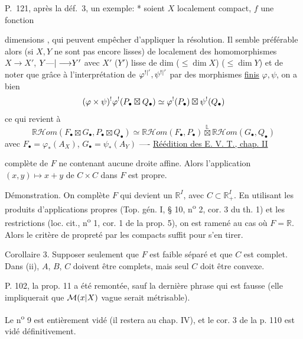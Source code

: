 P.\ 121, après la déf.\ 3, un exemple: * soient $X$ localement compact, $f$ une fonction

dimensions , qui peuvent empêcher d'appliquer la résolution. Il semble préférable alors  (si $X,Y$ ne sont pas encore lisses) de   localement des homomorphismes  $X\longrightarrow X'$, $Y{\text{---}|\longrightarrow}Y'$ avec $X'$ ($Y'$) lisse de dim ($\leq\dim X$) ($\leq\dim Y$) et de noter que grâce à l'interprétation de $\varphi^{{!|'}},\psi^{{!|'}}$ par des morphismes \uline{finis} $\varphi,\psi$, on a bien
\[
(\varphi\times\psi)^!{{\varphi^!}}(P_\bullet\boxtimes Q_\bullet)\simeq\varphi^!(P_\bullet)\boxtimes\psi^!(Q_\bullet)
\]
ce qui revient à
\[
\mathbb{R}\mathcal{H}om(F_\bullet\boxtimes G_\bullet,P_\bullet\boxtimes Q_\bullet)\simeq\mathbb{R}\mathcal{H}om(F_\bullet,P_\bullet)\overset{\mathbb{L}}{\boxtimes}\mathbb{R}\mathcal{H}om(G_\bullet,Q_\bullet)
\]
avec $F_\bullet=\varphi_*(A_X)$, $G_\bullet=\psi_*(A_Y)$ ----
\uline{Réédition des E. V. T., chap. II} 

complète de $F$ ne contenant aucune droite affine. Alors l'application $(x,y)\mapsto x+y$ de $C\times C$ dans $F$ est propre.

Démonstration. On complète $F$ qui devient un $\mathbb{R}^{I}$, avec $C\subset\mathbb{R}^{I}_{+}$. En utilisant les produits d'applications propres (Top. gén. I, § 10, n\textsuperscript{o} 2, cor. 3 du th. 1) et les restrictions (loc. cit., n\textsuperscript{o} 1, cor. 1 de la prop. 5), on est ramené au cas où $F=\mathbb{R}$. Alors le critère de propreté par les compacts suffit pour s'en tirer.

Corollaire 3. Supposer seulement que $F$ est faible séparé et que $C$ est complet. Dans (ii), $A$, $B$, $C$ doivent être complets, mais seul $C$ doit être convexe.

P. 102, la prop. 11 a été remontée, sauf la dernière phrase qui est fausse (elle impliquerait que $\mathcal{M}({x|X})$ vague serait métrisable).

Le n\textsuperscript{o} 9 est entièrement vidé (il restera au chap. IV), et le cor. 3 de la p. 110 est vidé définitivement.

